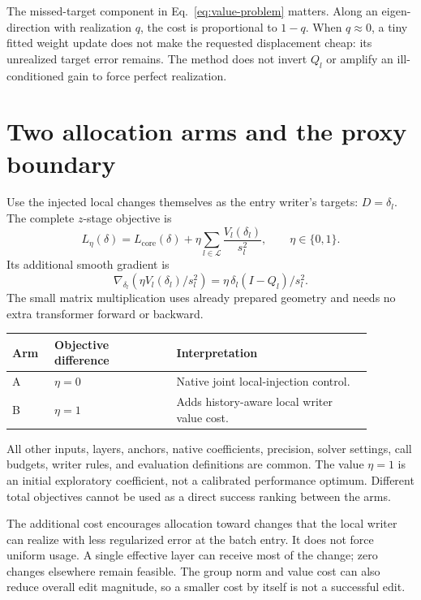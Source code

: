 \documentclass[11pt]{article}
\newcommand{\Lset}{\mathcal L}
\begin{document}
The missed-target component in Eq.~\eqref{eq:value-problem} matters. Along
an eigen-direction with realization $q$, the cost is proportional to
$1-q$. When $q\approx0$, a tiny fitted weight update does not make the
requested displacement cheap: its unrealized target error remains. The
method does not invert $Q_l$ or amplify an ill-conditioned gain to force
perfect realization.

\clearpage
\section{Two allocation arms and the proxy boundary}

Use the injected local changes themselves as the entry writer's targets:
$D=\delta_l$. The complete $z$-stage objective is
\begin{equation}
 \boxed{L_\eta(\delta)=L_{\mathrm{core}}(\delta)
                +\eta\sum_{l\in\Lset}\frac{V_l(\delta_l)}{s_l^2}},
 \qquad \eta\in\{0,1\}.
 \label{eq:arms}
\end{equation}
Its additional smooth gradient is
\begin{equation}
 \nabla_{\delta_l}\left(\eta V_l(\delta_l)/s_l^2\right)
       =\eta\,\delta_l(I-Q_l)/s_l^2.
\end{equation}
The small matrix multiplication uses already prepared geometry and needs
no extra transformer forward or backward.

\begin{center}
\begin{tabular}{p{0.10\linewidth}p{0.30\linewidth}p{0.48\linewidth}}
\toprule
Arm & Objective difference & Interpretation\\
\midrule
A & $\eta=0$ & Native joint local-injection control.\\
B & $\eta=1$ & Adds history-aware local writer value cost.\\
\bottomrule
\end{tabular}
\end{center}

All other inputs, layers, anchors, native coefficients, precision, solver
settings, call budgets, writer rules, and evaluation definitions are
common. The value $\eta=1$ is an initial exploratory coefficient, not a
calibrated performance optimum. Different total objectives cannot be used
as a direct success ranking between the arms.

The additional cost encourages allocation toward changes that the local
writer can realize with less regularized error at the batch entry. It does
not force uniform usage. A single effective layer can receive most of the
change; zero changes elsewhere remain feasible. The group norm and value
cost can also reduce overall edit magnitude, so a smaller cost by itself
is not a successful edit.
\end{document}
